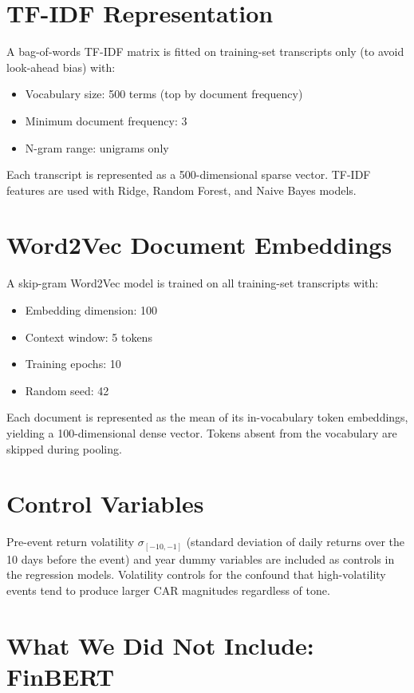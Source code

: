 \documentclass[12pt,a4paper]{article}
\begin{document}
\section{TF-IDF Representation}

A bag-of-words TF-IDF matrix is fitted on training-set transcripts only
(to avoid look-ahead bias) with:
\begin{itemize}
  \item Vocabulary size: 500 terms (top by document frequency)
  \item Minimum document frequency: 3
  \item N-gram range: unigrams only
\end{itemize}
Each transcript is represented as a 500-dimensional sparse vector.
TF-IDF features are used with Ridge, Random Forest, and Naive Bayes models.

\section{Word2Vec Document Embeddings}

A skip-gram Word2Vec model is trained on all training-set transcripts with:
\begin{itemize}
  \item Embedding dimension: 100
  \item Context window: 5 tokens
  \item Training epochs: 10
  \item Random seed: 42
\end{itemize}
Each document is represented as the mean of its in-vocabulary token embeddings,
yielding a 100-dimensional dense vector.
Tokens absent from the vocabulary are skipped during pooling.

\section{Control Variables}

Pre-event return volatility $\sigma_{[-10,-1]}$ (standard deviation of daily returns
over the 10 days before the event) and year dummy variables are included as
controls in the regression models.  Volatility controls for the confound that
high-volatility events tend to produce larger CAR magnitudes regardless of tone.

\section{What We Did Not Include: FinBERT}
\end{document}
